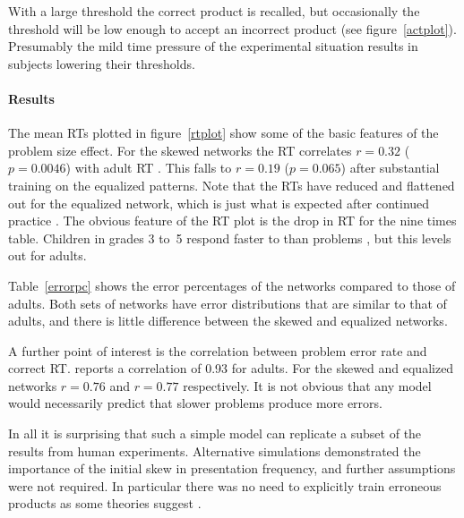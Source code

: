 With a large threshold the correct product is recalled, but
occasionally the threshold will be low enough to accept an incorrect
product (see figure~\ref{actplot}). Presumably the mild time pressure of
the experimental situation results in subjects lowering their thresholds.

\begin{figure}[bht]\centerline{}\end{figure}

\paragraph{Results} The mean RTs plotted in figure~\ref{rtplot} show some
of the basic features of the problem size effect.  For the skewed networks
the RT correlates $r=0.32$ ($p=0.0046$) with adult RT \cite{camp85}. This
falls to $r=0.19$ ($p=0.065$) after substantial training on the equalized
patterns.  Note that the RTs have reduced and flattened out for the
equalized network, which is just what is expected after continued practice
\cite[p.~349]{camp85}. The obvious feature of the RT plot is the drop in RT
for the nine times table.  Children in grades 3 to~5 respond faster to 
than  problems \cite{camp85}, but this levels out for adults.

 Table~\ref{errorpc} shows the error
percentages of the networks compared to those of adults.  Both sets of
networks have error distributions that are similar to that of adults, and
there is little difference between the skewed and equalized
networks.

A further point of interest is the correlation between problem error rate
and correct RT.  reports a correlation of 0.93 for
adults.  For the skewed and equalized networks $r=0.76$
and $r=0.77$ respectively.  It is not obvious that any model
would necessarily predict that slower problems produce more errors.

In all it is surprising that such a simple model can replicate a subset of
the results from human experiments. Alternative simulations demonstrated
the importance of the initial skew in presentation frequency, and further
assumptions were not required.  In particular there was no need to
explicitly train erroneous products as some theories suggest
\cite{siegmult,camp85}.

